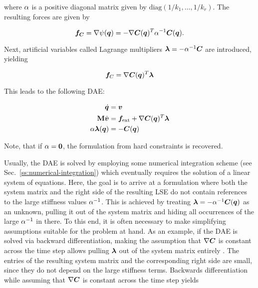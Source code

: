 \noindent where $\mathbf{\alpha}$ is a positive diagonal matrix given by $\text{diag}(1/k_1, \ldots, 1/k_r)$. The resulting forces are given by 

\begin{equation}\label{eq:compliant-force}
    \bm{f_C} = \nabla \psi(\bm{q}) = -\nabla \bm{C}(\bm{q})^T\mathbf{\alpha}^{-1} \bm{C}(\bm{q}).
\end{equation}

\noindent Next, artificial variables called Lagrange multipliers $\bm{\lambda} = -\mathbf{\alpha}^{-1}\bm{C}$ are introduced, yielding 

\begin{equation}\label{eq:compliant-force-lambda}
    \bm{f}_C = \nabla \bm{C}(\bm{q})^T\bm{\lambda}
\end{equation}

\noindent This leads to the following DAE:

\begin{equation}\label{eq:compliant-dae}
\begin{split}
    \dot{\bm{q}} &= \bm{v} \\
    \mathbf{M}\dot{\bm{v}} &= \bm{f}_\text{ext} + \nabla \bm{C}(\bm{q})^T\bm{\lambda} \\
    \mathbf{\alpha}\bm{\lambda}(\bm{q}) &= -\bm{C}(\bm{q})
\end{split}
\end{equation}

\noindent Note, that if $\mathbf{\alpha} = \mathbf{0}$, the formulation from hard constraints is recovered. 

Usually, the DAE is solved by employing some numerical integration scheme (see Sec.\ \ref{ss:numerical-integration}) which eventually requires 
the solution of a linear system of equations. Here, the goal is to arrive at a formulation where both the system matrix and the right 
side of the resulting LSE do not contain references to the large stiffness values
$\mathbf{\alpha}^{-1}$. This is achieved by treating $\bm{\lambda} = -\mathbf{\alpha}^{-1}\bm{C}(\bm{q})$ as an unknown, 
pulling it out of the system matrix and hiding all occurrences of the large $\mathbf{\alpha}^{-1}$ in there. To this end, it is often 
necessary to make simplifying assumptions suitable for the problem at hand. As an example, if the DAE is solved via backward 
differentiation, making the assumption that $\nabla \bm{C}$ is constant across the time step allows pulling $\bm{\lambda}$ out of 
the system matrix entirely \cite{tournier2015}. The entries of the resulting system matrix and the corresponding right side
are small, since they do not depend on the large stiffness terms. Backwards differentiation while assuming that $\nabla \bm{C}$ is 
constant across the time step yields

